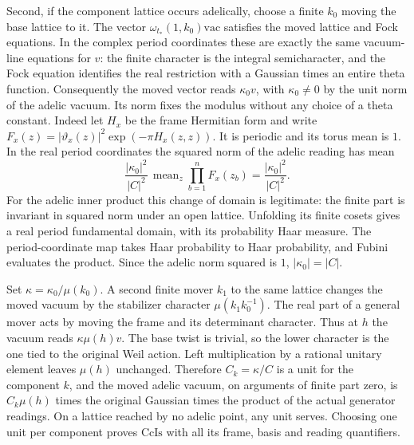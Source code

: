 Second, if the component lattice occurs adelically, choose a finite
$k_0$ moving the base lattice to it. The vector
$\omega_{t_*}(1,k_0)\mathrm{vac}$ satisfies the moved lattice and
Fock equations. In the complex period coordinates these are exactly
the same vacuum-line equations for $v$: the finite character is
the integral semicharacter, and the Fock equation identifies the
real restriction with a Gaussian times an entire theta function.
Consequently the moved vector reads $\kappa_0 v$, with
$\kappa_0\ne0$ by the unit norm of the adelic vacuum. Its norm fixes
the modulus without any choice of a theta constant. Indeed let
$H_x$ be the frame Hermitian form and write
$F_x(z)=|\vartheta_x(z)|^2\exp(-\pi H_x(z,z))$. It is periodic
and its torus mean is $1$. In the real period coordinates the
squared norm of the adelic reading has mean
\[
   \frac{|\kappa_0|^2}{|C|^2}\,
      \operatorname{mean}_{z}\prod_{b=1}^{n}F_x(z_b)
       =\frac{|\kappa_0|^2}{|C|^2}.
\]
For the adelic inner product this change of domain is legitimate:
the finite part is invariant in squared norm under an open lattice.
Unfolding its finite cosets gives a real period fundamental domain,
with its probability Haar measure. The period-coordinate map takes
Haar probability to Haar probability, and Fubini evaluates the
product. Since the adelic norm squared is $1$, $|\kappa_0|=|C|$.

Set $\kappa=\kappa_0/\mu(k_0)$. A second finite mover $k_1$ to the
same lattice changes the moved vacuum by the stabilizer character
$\mu(k_1k_0^{-1})$. The real part of a general mover acts by
moving the frame and its determinant character. Thus at $h$ the
vacuum reads $\kappa\mu(h)v$. The base twist is trivial, so the
lower character is the one tied to the original Weil action.
Left multiplication by a rational unitary element leaves $\mu(h)$
unchanged. Therefore $C_k=\kappa/C$ is a unit for the component
$k$, and the moved adelic vacuum, on arguments of finite part zero,
is $C_k\mu(h)$ times the original Gaussian times the product of the
actual generator readings. On a lattice reached by no adelic point,
any unit serves. Choosing one unit per component proves
$\mathrm{CcIs}$ with all its frame, basis and reading quantifiers.

